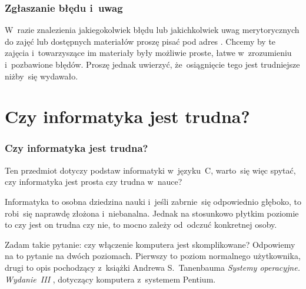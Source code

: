 \documentclass[10pt,t]{beamer}
\begin{document}
\begin{frame}
  \frametitle{Zgłaszanie błędu i~uwag}


  W~razie znalezienia jakiegokolwiek błędu lub jakichkolwiek uwag
  merytorycznych do zajęć lub dostępnych materiałów proszę pisać pod adres
  \email. Chcemy by te zajęcia i~towarzyszące im materiały były możliwie
  proste, łatwe w~zrozumieniu i~pozbawione błędów. Proszę jednak uwierzyć,
  że~osiągnięcie tego jest trudniejsze niżby~się wydawało.

\end{frame}










\section{Czy informatyka jest trudna?}



\begin{frame}
  \frametitle{Czy informatyka jest trudna?}


  Ten przedmiot dotyczy podstaw informatyki w~języku~C, warto~się
  więc spytać, czy informatyka jest prosta czy trudna w~nauce?

  Informatyka to osobna dziedzina nauki i~jeśli zabrnie~się odpowiednio
  głęboko, to robi~się naprawdę złożona i~niebanalna. Jednak na stosunkowo
  płytkim poziomie to czy jest on trudna czy nie, to mocno zależy od~odczuć
  konkretnej osoby.

  Zadam takie pytanie: czy włączenie komputera jest skomplikowane?
  Odpowiemy na to pytanie na dwóch poziomach. Pierwszy to poziom normalnego
  użytkownika, drugi to opis pochodzący z~książki Andrewa S.~Tanenbauma
  \textit{Systemy operacyjne. Wydanie~III}
  \parencite{Tannenbaum-Systemy-Operacyjne-Wydanie-III-Pub-2013}, dotyczący
  komputera z~systemem Pentium.

\end{frame}
\end{document}
